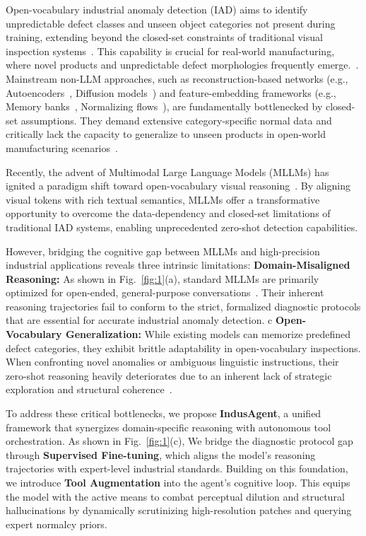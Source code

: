 \documentclass{article}
\begin{document}
Open-vocabulary industrial anomaly detection (IAD) aims to identify unpredictable defect classes and unseen object categories not present during training, extending beyond the closed-set constraints of traditional visual inspection systems~\citep{mvtec, visa}. This capability is crucial for real-world manufacturing, where novel products and unpredictable defect morphologies frequently emerge.~\citep{tao2022deep, jeong2023winclip}. Mainstream non-LLM approaches, such as reconstruction-based networks (e.g., Autoencoders~\citep{zavrtanik2021draem, bergmann2018improving}, Diffusion models~\citep{wyatt2022anoddpm, mu2023diffusionad}) and feature-embedding frameworks (e.g., Memory banks~\citep{roth2022patchcore, defard2021padim}, Normalizing flows~\citep{yu2021fastflow, rudolph2022csflow}), are fundamentally bottlenecked by closed-set assumptions. They demand extensive category-specific normal data and critically lack the capacity to generalize to unseen products in open-world manufacturing scenarios~\citep{gu2024anomalygpt}.

Recently, the advent of Multimodal Large Language Models (MLLMs) has ignited a paradigm shift toward open-vocabulary visual reasoning~\citep{gpt4v}. By aligning visual tokens with rich textual semantics, MLLMs offer a transformative opportunity to overcome the data-dependency and closed-set limitations of traditional IAD systems, enabling unprecedented zero-shot detection capabilities.

However, bridging the cognitive gap between MLLMs and high-precision industrial applications reveals three intrinsic limitations:  \textbf{Domain-Misaligned Reasoning:} As shown in Fig.~\ref{fig:1}(a), standard MLLMs are primarily optimized for open-ended, general-purpose conversations~\citep{liu2024visual}. Their inherent reasoning trajectories fail to conform to the strict, formalized diagnostic protocols that are essential for accurate industrial anomaly detection.  c  \textbf{Open-Vocabulary Generalization:} While existing models can memorize predefined defect categories, they exhibit brittle adaptability in open-vocabulary inspections. When confronting novel anomalies or ambiguous linguistic instructions, their zero-shot reasoning heavily deteriorates due to an inherent lack of strategic exploration and structural coherence~\citep{deepseekr1}.


To address these critical bottlenecks, we propose \textbf{IndusAgent}, a unified framework that synergizes domain-specific reasoning with autonomous tool orchestration. As shown in Fig.~\ref{fig:1}(c), We bridge the diagnostic protocol gap through \textbf{Supervised Fine-tuning}, which aligns the model's reasoning trajectories with expert-level industrial standards. Building on this foundation, we introduce \textbf{Tool Augmentation} into the agent's cognitive loop. This equips the model with the active means to combat perceptual dilution and structural hallucinations by dynamically scrutinizing high-resolution patches and querying expert normalcy priors. 
\end{document}
